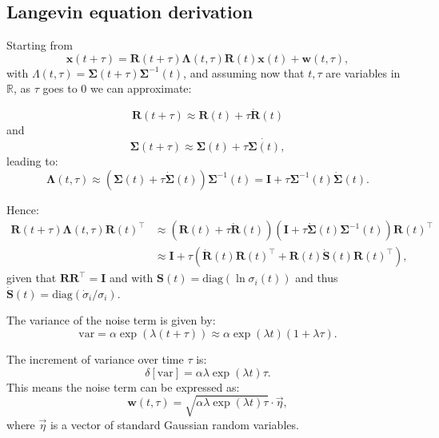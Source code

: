 \documentclass{article} %
\def\vw{{\bm{w}}}
\def\vx{{\bm{x}}}
\def\mI{{\bm{I}}}
\def\mR{{\bm{R}}}
\def\mS{{\bm{S}}}
\newcommand{\R}{\mathbb{R}}
\begin{document}
\subsection{Langevin equation derivation}
\label{app:lengevin-derivation}
Starting from
\begin{equation*}
   \vx(t+\tau) = \mR(t+\tau) \mathbf{\Lambda}(t, \tau) \mR(t) \vx(t) + \vw(t, \tau),
\end{equation*}
with $\Lambda(t,\tau) = \mathbf{\Sigma}(t+\tau) \mathbf{\Sigma}^{-1}(t)$, and assuming now that $t, \tau$ are variables in $\R$, as $\tau$ goes to 0 we can approximate:

\begin{equation*}
\mR(t+\tau) \approx \mR(t) + \tau \dot{\mR}(t)    
\end{equation*}
and
\begin{equation*}
    \mathbf{\Sigma}(t + \tau) \approx \mathbf{\Sigma}(t) + \tau \dot{\mathbf{\Sigma}(t)},
\end{equation*}
leading to:
\begin{equation*}
    \mathbf{\Lambda}(t, \tau) \approx \left( \mathbf{\Sigma}(t) + \tau \dot{\mathbf{\Sigma}}(t) \right) \mathbf{\Sigma}^{-1}(t) = \mI + \tau \mathbf{\Sigma}^{-1}(t) \dot{\mathbf{\Sigma}}(t).
\end{equation*}

Hence:
\begin{align*}
     \mR(t+\tau) \mathbf{\Lambda}(t, \tau) \mR(t)^{\top} &\approx 
     \left( \mR(t) + \tau \dot{\mR}(t) \right) \left( \mI + \tau \dot{\mathbf{\Sigma}}(t) \mathbf{\Sigma}^{-1}(t) \right) \mR(t)^{\top} \\
     &\approx \mI + \tau \left( \dot{\mR}(t) \mR(t)^{\top} + \mR(t) \dot{\mS}(t) \mR(t)^{\top} \right),
\end{align*}
given that $\mR\mR^{\top} = \mI$ and with $\mS(t) = \text{diag}\left(\ln{\sigma_i(t)}\right)$ and thus $\dot{\mS}(t) = \text{diag}(\dot{\sigma}_i/\sigma_i)$.

The variance of the noise term is given by:
\begin{equation*}
    \text{var} = \alpha \exp(\lambda(t+\tau)) \approx \alpha \exp(\lambda t) (1 + \lambda \tau).
\end{equation*}

The increment of variance over time  $\tau$ is:
\begin{equation*}
    \delta[\text{var}] = \alpha \lambda \exp(\lambda t) \tau.
\end{equation*}
This means the noise term can be expressed as:
\begin{equation*}
    \vw (t, \tau) = \sqrt{\alpha \lambda \exp(\lambda t) \tau} \cdot \vec{\eta},
\end{equation*}
where $\vec{\eta}$ is a vector of standard Gaussian random variables.
\end{document}
